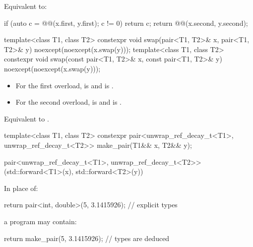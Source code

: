\begin{itemdescr}
\pnum
\effects
Equivalent to:
\begin{codeblock}
if (auto c = @@(x.first, y.first); c != 0) return c;
return @@(x.second, y.second);
\end{codeblock}
\end{itemdescr}

%
\begin{itemdecl}
template<class T1, class T2>
  constexpr void swap(pair<T1, T2>& x, pair<T1, T2>& y) noexcept(noexcept(x.swap(y)));
template<class T1, class T2>
  constexpr void swap(const pair<T1, T2>& x, const pair<T1, T2>& y) noexcept(noexcept(x.swap(y)));
\end{itemdecl}

\begin{itemdescr}
\pnum
\constraints
\begin{itemize}
\item
For the first overload,
 is  and
 is .
\item
For the second overload,
 is  and
 is .
\end{itemize}

\pnum
\effects
Equivalent to .
\end{itemdescr}

%
\begin{itemdecl}
template<class T1, class T2>
  constexpr pair<unwrap_ref_decay_t<T1>, unwrap_ref_decay_t<T2>> make_pair(T1&& x, T2&& y);
\end{itemdecl}

\begin{itemdescr}
\pnum
\returns
\begin{codeblock}
pair<unwrap_ref_decay_t<T1>,
     unwrap_ref_decay_t<T2>>(std::forward<T1>(x), std::forward<T2>(y))
\end{codeblock}
\end{itemdescr}

\pnum
\begin{example}
In place of:
\begin{codeblock}
return pair<int, double>(5, 3.1415926);     // explicit types
\end{codeblock}
a \Cpp{} program may contain:
\begin{codeblock}
return make_pair(5, 3.1415926);             // types are deduced
\end{codeblock}
\end{example}

